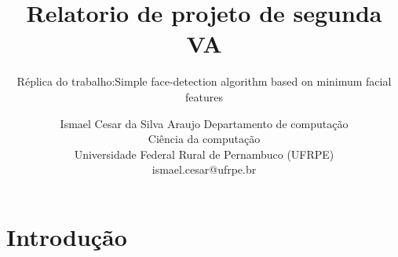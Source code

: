 \documentclass[journal,onecolumn]{IEEEtran}
\title{Relatorio de projeto de segunda VA}
\subtitle{Réplica do trabalho:Simple face-detection algorithm based on minimum facial features}
\author{		Ismael Cesar da Silva Araujo
  				Departamento de computação \\
				  Ciência da computação\\
		Universidade Federal Rural de Pernambuco (UFRPE)\\
			ismael.cesar@ufrpe.br}
\date{}
\begin{document}
\maketitle

\section{Introdução}
\end{document}
